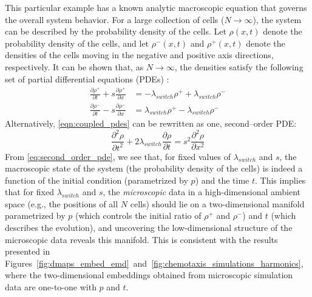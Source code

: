 This particular example has a known analytic macroscopic equation that governs the overall system behavior.
%
For a large collection of cells ($N \rightarrow \infty$), the system can be described by the probability density of the cells.
%
Let $\rho(x, t)$ denote the probability density of the cells, and let $\rho^-(x, t)$ and $\rho^+(x, t)$ denote the densities of the cells moving in the negative and positive axis directions, respectively.
%
It can be shown that, as $N \rightarrow \infty$, the densities satisfy the following set of partial differential equations (PDEs) \cite{othmer2000diffusion}:
\begin{equation} \label{eqn:coupled_pdes}
\begin{aligned}
\frac{\partial \rho^+}{\partial t} + s \frac{\partial \rho^+}{\partial x} & = -\lambda_{switch} \rho^+ +\lambda_{switch} \rho^- \\
\frac{\partial \rho^-}{\partial t} - s \frac{\partial \rho^-}{\partial x} & = \lambda_{switch} \rho^+ -\lambda_{switch} \rho^-
\end{aligned}
\end{equation}
%
Alternatively, \eqref{eqn:coupled_pdes} can be rewritten as one, second--order PDE:
\begin{equation} \label{eq:second_order_pde}
\frac{\partial^2 \rho}{\partial t^2} + 2 \lambda_{switch} \frac{\partial \rho}{\partial t} = s^2 \frac{\partial ^2 \rho}{\partial x^2}
\end{equation}
%
From \eqref{eq:second_order_pde}, we see that, for fixed values of $\lambda_{switch}$ and $s$, the macroscopic state of the system (the probability density of the cells) is indeed a function of the initial condition (parametrized by $p$) and the time $t$.
%
This implies that for fixed $\lambda_{switch}$ and $s$, the {\em microscopic} data in a high-dimensional ambient space (e.g., the positions of all $N$ cells) should lie on a two-dimensional manifold parametrized by $p$ (which controls the initial ratio of $\rho^+$ and $\rho^-$) and $t$ (which describes the evolution),
and uncovering the low-dimensional structure of the microscopic data reveals this manifold.
%
This is consistent with the results presented in Figures~\ref{fig:dmaps_embed_emd}~and~\ref{fig:chemotaxis_simulations_harmonics}, where the two-dimensional embeddings obtained from microscopic simulation data are one-to-one with $p$ and $t$.

